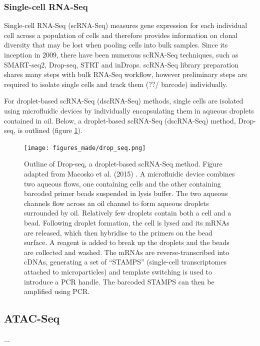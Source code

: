 
\subsubsection{Single-cell RNA-Seq}
Single-cell RNA-Seq (scRNA-Seq) measures gene expression for each individual cell across a population of cells and therefore provides information on clonal diversity that may be lost when pooling cells into bulk samples.
Since its inception in 2009\cite{tang2009mrna}, there have been numerous scRNA-Seq techniques, such as SMART-seq2\cite{picelli2013smart}, Drop-seq\cite{macosko2015highly}, STRT\cite{islam2011characterization} and inDrops\cite{klein2015droplet}.
scRNA-Seq library preparation shares many steps with bulk RNA-Seq workflow, however preliminary steps are required to isolate single cells and track them (??/ barcode) individually.

For droplet-based scRNA-Seq (dscRNA-Seq) methods, single cells are isolated using microfluidic devices by individually encapsulating them in aqueous droplets contained in oil.
Below, a droplet-based scRNA-Seq (dscRNA-Seq) method, Drop-seq, is outlined (figure \ref{fig:dropseq}).

\begin{figure}
\centering\texttt{[image: figures\_made/drop\_seq.png]}
\caption[Drop-seq schematic]{Outline of Drop-seq, a droplet-based scRNA-Seq method.
Figure adapted from Macosko et al. (2015) \cite{macosko2015highly}.
A microfluidic device combines two aqueous flows, one containing cells and the other containing barcoded primer beads suspended in lysis buffer.
The two aqueous channels flow across an oil channel to form aqueous droplets surrounded by oil.
Relatively few droplets contain both a cell and a bead.
Following droplet formation, the cell is lysed and its mRNAs are released, which then hybridise to the primers on the bead surface.
A reagent is added to break up the droplets and the beads are collected and washed.
The mRNAs are reverse-transcribed into cDNAs, generating a set of ``STAMPS'' (single-cell transcriptomes attached to microparticles) and template switching is used to introduce a PCR handle.
The barcoded STAMPS can then be amplified using PCR.}
\label{fig:dropseq}\end{figure}


\subsection{ATAC-Seq}
...

